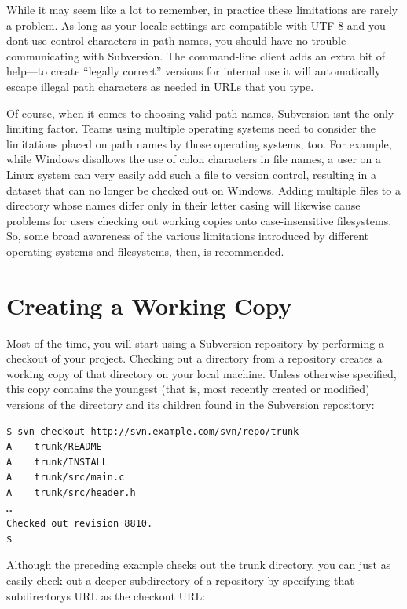 While it may seem like a lot to remember, in practice these limitations
are rarely a problem. As long as your locale settings are compatible
with UTF-8 and you don\textquotesingle t use control characters in path
names, you should have no trouble communicating with Subversion. The
command-line client adds an extra bit of help---to create ``legally
correct'' versions for internal use it will automatically escape illegal
path characters as needed in URLs that you type.

Of course, when it comes to choosing valid path names, Subversion
isn\textquotesingle t the only limiting factor. Teams using multiple
operating systems need to consider the limitations placed on path names
by those operating systems, too. For example, while Windows disallows
the use of colon characters in file names, a user on a Linux system can
very easily add such a file to version control, resulting in a dataset
that can no longer be checked out on Windows. Adding multiple files to a
directory whose names differ only in their letter casing will likewise
cause problems for users checking out working copies onto
case-insensitive filesystems. So, some broad awareness of the various
limitations introduced by different operating systems and filesystems,
then, is recommended.

\section{Creating a Working Copy}\label{svn.tour.initial}

Most of the time, you will start using a Subversion repository by
performing a checkout of your project. Checking out a directory from a
repository creates a working copy of that directory on your local
machine. Unless otherwise specified, this copy contains the youngest
(that is, most recently created or modified) versions of the directory
and its children found in the Subversion repository:

\begin{verbatim}
$ svn checkout http://svn.example.com/svn/repo/trunk
A    trunk/README
A    trunk/INSTALL
A    trunk/src/main.c
A    trunk/src/header.h
…
Checked out revision 8810.
$
\end{verbatim}

Although the preceding example checks out the trunk directory, you can
just as easily check out a deeper subdirectory of a repository by
specifying that subdirectory\textquotesingle s URL as the checkout URL:

